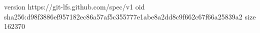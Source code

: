 version https://git-lfs.github.com/spec/v1
oid sha256:d98f3886ef957182ec86a57af5c355777e1abe8a2dd8c9f662c67f66a25839a2
size 162370
